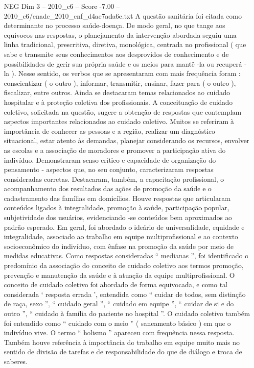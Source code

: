 \begin{textsample}{NEG Dim 3 – 2010\_c6 – Score -7.00 – 2010\_c6/enade\_2010\_enf\_d4ae7ada6c.txt}
A questão sanitária foi citada como determinante no processo saúde-doença.
De modo geral, no que tange aos equívocos nas respostas, o planejamento da intervenção abordada seguiu uma linha tradicional, prescritiva, diretiva, monológica, centrada no profissional ( que sabe e transmite seus conhecimentos aos desprovidos de conhecimento e de possibilidades de gerir sua própria saúde e os meios para mantê -la ou recuperá -la ).
Nesse sentido, os verbos que se apresentaram com mais frequência foram : conscientizar ( o outro ), informar, transmitir, ensinar, fazer para ( o outro ), fiscalizar, entre outros.
Ainda se destacaram temas relacionados ao cuidado hospitalar e à proteção coletiva dos profissionais.
A conceituação de cuidado coletivo, solicitada na questão, sugere a obtenção de respostas que contemplam aspectos importantes relacionados ao cuidado coletivo.
Muitos se referiram à importância de conhecer as pessoas e a região, realizar um diagnóstico situacional, estar atento às demandas, planejar considerando os recursos, envolver as escolas e a associação de moradores e promover a participação ativa do indivíduo.
Demonstraram senso crítico e capacidade de organização do pensamento - aspectos que, no seu conjunto, caracterizaram respostas consideradas corretas.
Destacaram, também, a capacitação profissional, o acompanhamento dos resultados das ações de promoção da saúde e o cadastramento das famílias em domicílios.
Houve respostas que articularam conteúdos ligados à integralidade, promoção à saúde, participação popular, subjetividade dos usuários, evidenciando -se conteúdos bem aproximados ao padrão esperado.
Em geral, foi abordado o ideário de universalidade, equidade e integralidade, associado ao trabalho em equipe multiprofissional e ao contexto socioeconômico do indivíduo, com ênfase na promoção da saúde por meio de medidas educativas.
Como respostas consideradas “ medianas ”, foi identificado o predomínio da associação do conceito de cuidado coletivo aos termos promoção, prevenção e manutenção da saúde e à atuação da equipe multiprofissional.
O conceito de cuidado coletivo foi abordado de forma equivocada, e como tal considerada ‘ resposta errada ’, entendida como “ cuidar de todos, sem distinção de raça, sexo ”, “ cuidado geral ”, “ cuidado em equipe ”, “ cuidar de si e do outro ”, “ cuidado à família do paciente no hospital ”.
O cuidado coletivo também foi entendido como “ cuidado com o meio ” ( saneamento básico ) em que o indivíduo vive.
O termo “ holismo ” apareceu com frequência nessa resposta.
Também houve referência à importância do trabalho em equipe muito mais no sentido de divisão de tarefas e de responsabilidade do que de diálogo e troca de saberes.

\end{textsample}
